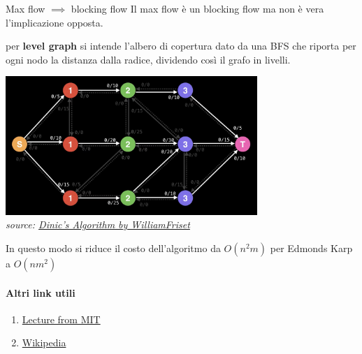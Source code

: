 \begin{obs}{Max flow $\implies$ blocking flow}{}
    Il max flow è un blocking flow ma non è vera l'implicazione opposta.
\end{obs}
per \textbf{level graph} si intende l'albero di copertura dato da una BFS che riporta per ogni nodo la distanza dalla radice, dividendo così il grafo in livelli.
\begin{center}
    \includegraphics[height=5.25cm]{resources/images/levelGraph.png}\\
    \textit{source: \href{https://www.youtube.com/watch?v=M6cm8UeeziI&t=2s}{Dinic's Algorithm by WilliamFriset}}
\end{center}
In questo modo si riduce il costo dell'algoritmo da $O(n^2m)$ per Edmonds Karp a $O(nm^2)$
\paragraph{Altri link utili}\begin{enumerate}
    \item \href{http://courses.csail.mit.edu/6.854/16/Notes/n10-blocking_flows.html}{Lecture from MIT}
    \item \href{https://en.wikipedia.org/wiki/Dinic%27s_algorithm}{Wikipedia}
\end{enumerate}

\cleardoublepage

